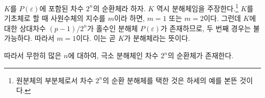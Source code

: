 \documentclass[11pt]{article}
\begin{document}
$K$를 $P(\varepsilon)$에 포함된 차수 $2^n$의 순환체라 하자. $K$ 역시 분해체임을 주장한다.\footnote{원분체의 부분체로서 차수 $2^n$의 순환 분해체를 택한 것은 하세의 예를 본뜬 것이다.} $K$를 기초체로 할 때 사원수체의 지수를 $m$이라 하면, $m=1$ 또는 $m=2$이다. 그런데 $K$에 대한 상대차수 $(p-1)/2^n$가 홀수인 분해체 $P(\varepsilon)$가 존재하므로, 두 번째 경우는 불가능하다. 따라서 $m=1$이다. 이는 곧 $K$가 분해체라는 뜻이다.

따라서 무한히 많은 $n$에 대하여, 극소 분해체인 차수 $2^n$의 순환체가 존재한다.
\end{document}
